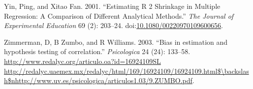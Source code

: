 \documentclass[]{article}
\begin{document}
\hypertarget{ref-Yin2001}{}
Yin, Ping, and Xitao Fan. 2001. ``Estimating R 2 Shrinkage in Multiple
Regression: A Comparison of Different Analytical Methods.'' \emph{The
Journal of Experimental Education} 69 (2): 203--24.
doi:\href{https://doi.org/10.1080/00220970109600656}{10.1080/00220970109600656}.

\hypertarget{ref-Zimmerman2003}{}
Zimmerman, D, B Zumbo, and R Williams. 2003. ``Bias in estimation and
hypothesis testing of correlation.'' \emph{Psicologica} 24 (24):
133--58.
\href{http://www.redalyc.org/articulo.oa?id=16924109SL\%20http://redalyc.uaemex.mx/redalyc/html/169/16924109/16924109.html$/backslash$nhttp://www.uv.es/psicologica/articulos1.03/9.ZUMBO.pdf}{http://www.redalyc.org/articulo.oa?id=16924109SL http://redalyc.uaemex.mx/redalyc/html/169/16924109/16924109.html\$\textbackslash{}backslash\$nhttp://www.uv.es/psicologica/articulos1.03/9.ZUMBO.pdf}.
\end{document}
